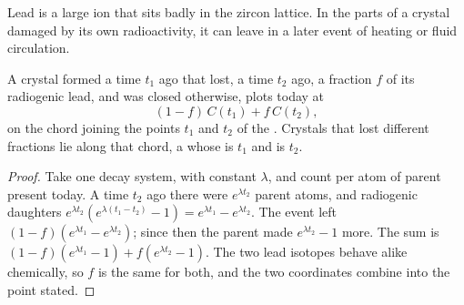Lead is a large ion that sits badly in the zircon lattice. In the parts of a
crystal damaged by its own radioactivity, it can leave in a later event of
heating or fluid circulation.

\begin{theorem}\label{thm:b3:advanced-geochronology:discordia}
A crystal formed a time $t_1$ ago that lost, a time $t_2$ ago, a fraction $f$
of its radiogenic lead, and was closed otherwise, plots today at
\[
(1 - f)\,C(t_1) + f\,C(t_2),
\]
on the chord joining the points $t_1$ and $t_2$ of the . Crystals that
lost different fractions lie along that chord, a  whose  is $t_1$ and  is $t_2$.
\end{theorem}

\begin{proof}
Take one decay system, with constant $\lambda$, and count per atom of parent
present today. A time $t_2$ ago there were $e^{\lambda t_2}$ parent atoms, and
radiogenic daughters $e^{\lambda t_2}(e^{\lambda(t_1 - t_2)} - 1) =
e^{\lambda t_1} - e^{\lambda t_2}$. The event left $(1 - f)(e^{\lambda t_1} -
e^{\lambda t_2})$; since then the parent made $e^{\lambda t_2} - 1$ more. The
sum is $(1 - f)(e^{\lambda t_1} - 1) + f(e^{\lambda t_2} - 1)$. The two lead
isotopes behave alike chemically, so $f$ is the same for both, and the two
coordinates combine into the point stated.
\end{proof}

